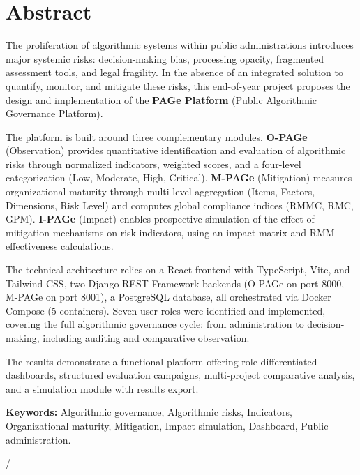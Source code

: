 \chapter*{Abstract}

The proliferation of algorithmic systems within public administrations introduces major systemic risks: decision-making bias, processing opacity, fragmented assessment tools, and legal fragility. In the absence of an integrated solution to quantify, monitor, and mitigate these risks, this end-of-year project proposes the design and implementation of the \textbf{PAGe Platform} (Public Algorithmic Governance Platform).

The platform is built around three complementary modules. \textbf{O-PAGe} (Observation) provides quantitative identification and evaluation of algorithmic risks through normalized indicators, weighted scores, and a four-level categorization (Low, Moderate, High, Critical). \textbf{M-PAGe} (Mitigation) measures organizational maturity through multi-level aggregation (Items, Factors, Dimensions, Risk Level) and computes global compliance indices (RMMC, RMC, GPM). \textbf{I-PAGe} (Impact) enables prospective simulation of the effect of mitigation mechanisms on risk indicators, using an impact matrix and RMM effectiveness calculations.

The technical architecture relies on a React frontend with TypeScript, Vite, and Tailwind CSS, two Django REST Framework backends (O-PAGe on port 8000, M-PAGe on port 8001), a PostgreSQL database, all orchestrated via Docker Compose (5 containers). Seven user roles were identified and implemented, covering the full algorithmic governance cycle: from administration to decision-making, including auditing and comparative observation.

The results demonstrate a functional platform offering role-differentiated dashboards, structured evaluation campaigns, multi-project comparative analysis, and a simulation module with results export.

\vspace{0.5cm}
\noindent\textbf{Keywords:} Algorithmic governance, Algorithmic risks, Indicators, Organizational maturity, Mitigation, Impact simulation, Dashboard, Public administration.

/\cleardoublepage

